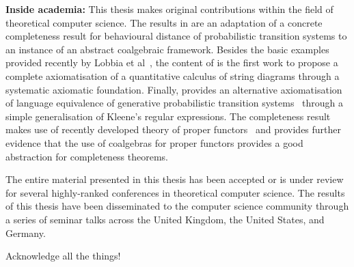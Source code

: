 \begin{impactstatement}
\textbf{Inside academia:} This thesis makes original contributions within the field of theoretical computer science. The results in  are an adaptation of a concrete completeness result for behavioural distance of probabilistic transition systems to an instance of an abstract coalgebraic framework. Besides the basic examples provided recently by Lobbia et al~\cite{Lobbia:2024:Quantitative}, the content of  is the first work to propose a complete axiomatisation of a quantitative calculus of string diagrams through a systematic axiomatic foundation. Finally,  provides an alternative axiomatisation of language equivalence of generative probabilistic transition systems~\cite{Glabbeek:1995:Reactive} through a simple generalisation of Kleene’s regular expressions. The completeness result makes use of recently developed theory of proper functors~\cite{Milius:2018:Proper} and provides further evidence that the use of coalgebras for proper functors provides a good abstraction for completeness theorems.

The entire material presented in this thesis has been accepted or is under review for several highly-ranked conferences in theoretical computer science. The results of this thesis have been disseminated to the computer science community through a series of seminar talks across the United Kingdom, the United States, and Germany. 
\end{impactstatement}

\begin{acknowledgements}
Acknowledge all the things!
\end{acknowledgements}

\setcounter{tocdepth}{2} 

\tableofcontents
\listoffigures
\listoftables

